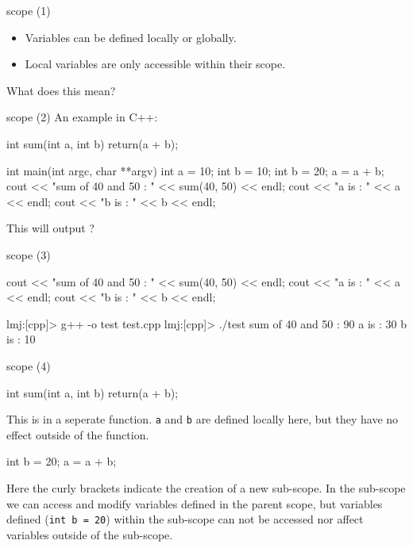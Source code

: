 \documentclass[pdf]{beamer}
\begin{document}
\begin{frame}[fragile]{scope (1)}
  \begin{itemize}
  \item Variables can be defined locally or globally.
  \item Local variables are only accessible within their scope.
  \end{itemize}

  What does this mean?
\end{frame}


\begin{frame}[fragile]{scope (2)}
  An example in C++:
  \begin{cppcode}
    int sum(int a, int b){
      return(a + b);
    }

    int main(int argc, char **argv){
      int a = 10;
      int b = 10;
      {
        int b = 20;
        a = a + b;
      }
      cout << "sum of 40 and 50 : " << sum(40, 50) << endl;
      cout << "a is : " << a << endl;
      cout << "b is : " << b << endl;
    }
  \end{cppcode}

  This will output ?
\end{frame}

\begin{frame}[fragile]{scope (3)}
  \begin{cppcode}
    cout << "sum of 40 and 50 : " << sum(40, 50) << endl;
    cout << "a is : " << a << endl;
    cout << "b is : " << b << endl;    
  \end{cppcode}
  
  \begin{figure}[ht]
  \end{figure}

  \begin{consolecode}
    lmj:[cpp]> g++ -o test test.cpp
    lmj:[cpp]> ./test
    sum of 40 and 50 : 90
    a is : 30
    b is : 10
  \end{consolecode}
\end{frame}

\begin{frame}[fragile]{scope (4)}
  \begin{cppcode}
    int sum(int a, int b){
      return(a + b);
    }
  \end{cppcode}
  \small{
  This is in a seperate function. \texttt{a} and \texttt{b} are defined
  locally here, but they have no effect outside of the function.
  }

  \vspace{1em}

  \begin{cppcode}
    {
      int b = 20;
      a = a + b;
    }
  \end{cppcode}
  \small{Here the curly brackets indicate the creation of a new sub-scope. In the sub-scope
  we can access and modify variables defined in the parent
  scope, but variables defined (\texttt{int b = 20}) within the sub-scope can
  not be accessed nor affect variables outside of the sub-scope.
  }
\end{frame}
\end{document}
